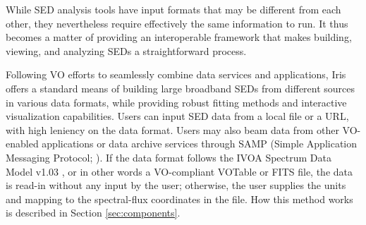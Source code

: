 \documentclass[5p]{elsarticle}
\begin{document}

While SED analysis tools have input formats that may be different from each other, they nevertheless require effectively the same information to run. It thus becomes a matter of providing an interoperable framework that makes building, viewing, and analyzing SEDs a straightforward process.


Following VO efforts to seamlessly combine data services and applications, Iris offers a standard means of building large broadband SEDs from different sources in various data formats, while providing robust fitting methods and interactive visualization capabilities. Users can input SED data from a local file or a URL, with high leniency on the data format. Users may also beam data from other VO-enabled applications or data archive services through SAMP (Simple Application Messaging Protocol; \citep{2011arXiv1110.0528T}). If the data format follows the IVOA Spectrum Data Model v1.03 \citep{2012arXiv1204.3055M}, or in other words a VO-compliant VOTable or FITS file, the data is read-in without any input by the user; otherwise, the user supplies the units and mapping to the spectral-flux coordinates in the file. How this method works is described in Section \ref{sec:components}.


\end{document}
